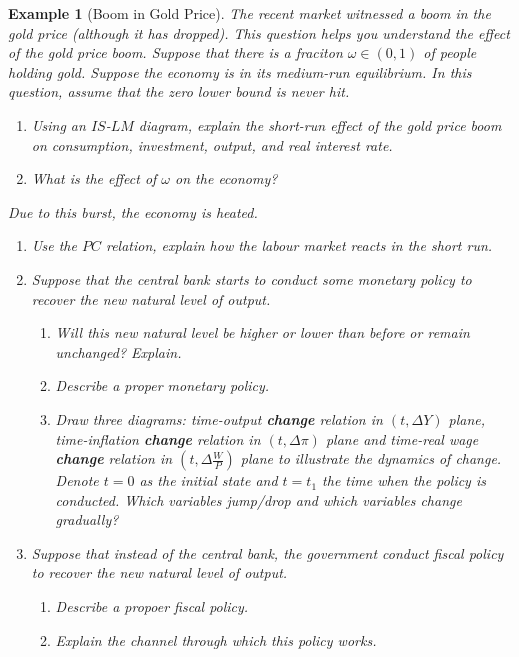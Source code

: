 \documentclass[12pt]{article}
\newtheorem{example}{Example}
\begin{document}
\begin{example}[Boom in Gold Price]
  The recent market witnessed a boom in the gold price (although it has dropped). This question helps you understand the effect of the gold price boom. Suppose that there is a fraciton $\omega \in (0,1)$ of people holding gold. Suppose the economy is in its medium-run equilibrium. In this question, assume that the zero lower bound is never hit.
  \begin{enumerate}[label=(\arabic*)]
    \item Using an $IS$-$LM$ diagram, explain the short-run effect of the gold price boom on consumption, investment, output, and real interest rate. 
    \vspace{80pt}
    \item What is the effect of $\omega$ on the economy?
  \end{enumerate}
  \newpage
  Due to this burst, the economy is heated.
  \begin{enumerate}[label=(\arabic*),resume] 
    \item Use the $PC$ relation, explain how the labour market reacts in the short run. 
    \vspace{80pt}
    \item Suppose that the central bank starts to conduct some monetary policy to recover the new natural level of output.
    \begin{enumerate}[label=\alph*.]
      \item Will this new natural level be higher or lower than before or remain unchanged? Explain.
      \vspace{80pt}
      \item Describe a proper monetary policy.
      \vspace{80pt}
      \item Draw three diagrams: time-output \textbf{change} relation in $(t, \Delta Y)$ plane, time-inflation \textbf{change}  relation in $(t, \Delta \pi)$ plane and time-real wage \textbf{change}  relation in $(t, \Delta \frac{W}{P})$ plane to illustrate the dynamics of change. Denote $t=0$ as the initial state and $t=t_1$ the time when the policy is conducted. Which variables jump/drop and which variables change gradually?
    \end{enumerate}
    \vspace{120pt}
    \newpage
    \item Suppose that instead of the central bank, the government conduct fiscal policy to recover the new natural level of output. 
    \begin{enumerate}
      \item Describe a propoer fiscal policy.
      \vspace{80pt}
      \item Explain the channel through which this policy works.
      \vspace{80pt}
    \end{enumerate}
  \end{enumerate} 
\end{example}
\end{document}
